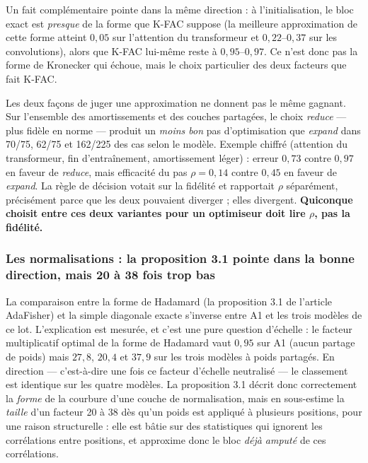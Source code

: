 \documentclass[11pt,a4paper]{article}
\newcommand{\eng}[1]{\emph{#1}}
\begin{document}
Un fait complémentaire pointe dans la même direction : à l'initialisation, le bloc exact est
\emph{presque} de la forme que K-FAC suppose (la meilleure approximation de cette forme atteint
$0{,}05$ sur l'attention du transformeur et $0{,}22$--$0{,}37$ sur les convolutions), alors que
K-FAC lui-même reste à $0{,}95$--$0{,}97$. Ce n'est donc pas la forme de Kronecker qui échoue, mais
le choix particulier des deux facteurs que fait K-FAC.

\begin{encadre}
Les deux façons de juger une approximation ne donnent pas le même gagnant. Sur l'ensemble des
amortissements et des couches partagées, le choix \eng{reduce} — plus fidèle en norme — produit un
\emph{moins bon} pas d'optimisation que \eng{expand} dans 70/75, 62/75 et 162/225 des cas selon le
modèle. Exemple chiffré (attention du transformeur, fin d'entraînement, amortissement léger) :
erreur $0{,}73$ contre $0{,}97$ en faveur de \eng{reduce}, mais efficacité du pas $\rho = 0{,}14$
contre $0{,}45$ en faveur de \eng{expand}. La règle de décision votait sur la fidélité et
rapportait $\rho$ séparément, précisément parce que les deux pouvaient diverger ; elles divergent.
\textbf{Quiconque choisit entre ces deux variantes pour un optimiseur doit lire $\rho$, pas la
fidélité.}
\end{encadre}

\subsubsection*{Les normalisations : la proposition 3.1 pointe dans la bonne direction, mais 20 à 38 fois trop bas}

La comparaison entre la forme de Hadamard (la proposition 3.1 de l'article AdaFisher) et la simple
diagonale exacte s'inverse entre A1 et les trois modèles de ce lot. L'explication est mesurée, et
c'est une pure question d'échelle : le facteur multiplicatif optimal de la forme de Hadamard vaut
$0{,}95$ sur A1 (aucun partage de poids) mais $27{,}8$, $20{,}4$ et $37{,}9$ sur les trois modèles à
poids partagés. En direction — c'est-à-dire une fois ce facteur d'échelle neutralisé — le classement
est identique sur les quatre modèles. La proposition 3.1 décrit donc correctement la \emph{forme} de
la courbure d'une couche de normalisation, mais en sous-estime la \emph{taille} d'un facteur 20 à 38
dès qu'un poids est appliqué à plusieurs positions, pour une raison structurelle : elle est bâtie
sur des statistiques qui ignorent les corrélations entre positions, et approxime donc le bloc
\emph{déjà amputé} de ces corrélations.
\end{document}
